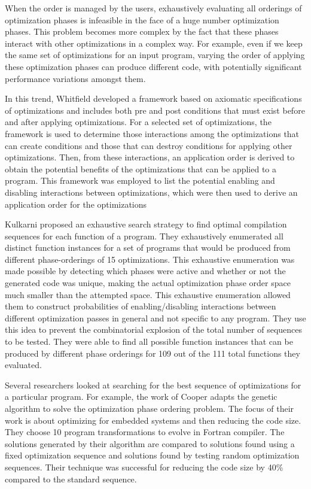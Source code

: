 When the order is managed by the users, exhaustively evaluating  all orderings of optimization phases is infeasible in the face of a huge number optimization phases. This problem becomes more complex by the fact that these phases interact with other optimizations in a complex way.
For example, even if we keep the same set of optimizations for an input program, varying the order of applying these optimization phases can produce different code, with potentially significant performance variations amongst them. 

In this trend, Whitfield\cite{whitfield1990approach} developed a framework based on axiomatic specifications of optimizations and includes both pre and post conditions that must exist before and after applying optimizations. For a selected set of optimizations, the framework is used to determine those interactions among the optimizations that can create conditions and those that can destroy conditions for applying other optimizations. Then, from these interactions, an application order is derived to obtain the potential benefits of the optimizations that can be applied to a program. 
This framework was employed to list the potential enabling and disabling interactions between optimizations, which were then used to derive an application
order for the optimizations

Kulkarni \etal\cite{kulkarni2009practical,kulkarni2006exhaustive} proposed an exhaustive search strategy to find optimal compilation sequences for each function of a program. They exhaustively enumerated all distinct function instances for a set of programs that would be produced from different phase-orderings of 15 optimizations. This exhaustive enumeration was made possible by detecting which phases were active and whether or not the generated code was unique, making the actual optimization phase order space much smaller than the attempted space. This exhaustive enumeration allowed them to construct probabilities of enabling/disabling interactions between different optimization passes in general and not specific to any program. They use this idea to prevent the combinatorial explosion of the total number of sequences to be tested. 
They were able to find all possible function instances that can be produced by different phase orderings for 109 out of the 111 total functions they evaluated.


Several researchers looked at searching for the best sequence of optimizations for a particular program. For example, the work of Cooper \etal\cite{cooper1999optimizing} adapts the genetic algorithm to solve the optimization phase ordering problem. The focus of their work is about optimizing for embedded systems and then reducing the code size. They choose 10 program transformations to evolve in Fortran compiler. The solutions generated by their algorithm are compared to solutions found using a fixed optimization sequence and solutions found by testing random optimization sequences. Their technique was successful for reducing the code size by 40\% compared to the standard sequence.

